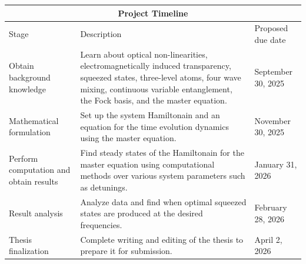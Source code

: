 \documentclass[aps,pra,showpacs,amsmath,amssymb,nofootinbib,longbibliography,superscriptaddress
]{revtex4-1}
\theoremstyle{definition}
\theoremstyle{remark}
\newcommand{\0}{\hat{0}}
\begin{document}
\begin{center}
    \begin{tabular}{ |p{4cm}||p{10cm}|p{3cm}|  }
        \hline
        \multicolumn{3}{|c|}{Project Timeline} \\
        \hline
        Stage &  Description & Proposed due date\\
        \hline
        \raggedright Obtain background knowledge & Learn about optical non-linearities, electromagnetically induced transparency, squeezed states, three-level atoms, four wave mixing, continuous variable entanglement, the Fock basis, and the master equation. & September 30, 2025\\
        \hline
        Mathematical formulation & Set up the system Hamiltonain and an equation for the time evolution dynamics using the master equation. & November 30, 2025\\
        \hline
        Perform computation and obtain results & Find steady states of the Hamiltonain for the master equation using computational methods over various system parameters such as detunings. & January 31, 2026\\
        \hline
        Result analysis & Analyze data and find when optimal squeezed states are produced at the desired frequencies. & February 28, 2026\\
        \hline
        Thesis finalization & Complete writing and editing of the thesis to prepare it for submission. & April 2, 2026\\
        \hline
    \end{tabular}
\end{center}




\end{document}
